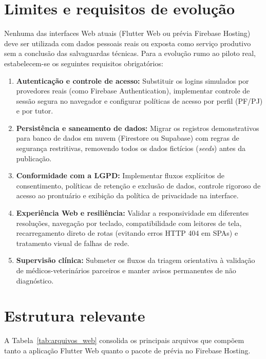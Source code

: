 \documentclass[12pt,a4paper]{article}
\begin{document}
\section{Limites e requisitos de evolução}
Nenhuma das interfaces Web atuais (Flutter Web ou prévia Firebase Hosting) deve ser utilizada com dados pessoais reais ou exposta como serviço produtivo sem a conclusão das salvaguardas técnicas. Para a evolução rumo ao piloto real, estabelecem-se os seguintes requisitos obrigatórios:

\begin{enumerate}[leftmargin=*]
  \item \textbf{Autenticação e controle de acesso:} Substituir os logins simulados por provedores reais (como Firebase Authentication), implementar controle de sessão segura no navegador e configurar políticas de acesso por perfil (PF/PJ) e por tutor.
  \item \textbf{Persistência e saneamento de dados:} Migrar os registros demonstrativos para banco de dados em nuvem (Firestore ou Supabase) com regras de segurança restritivas, removendo todos os dados fictícios (\textit{seeds}) antes da publicação.
  \item \textbf{Conformidade com a LGPD:} Implementar fluxos explícitos de consentimento, políticas de retenção e exclusão de dados, controle rigoroso de acesso ao prontuário e exibição da política de privacidade na interface.
  \item \textbf{Experiência Web e resiliência:} Validar a responsividade em diferentes resoluções, navegação por teclado, compatibilidade com leitores de tela, recarregamento direto de rotas (evitando erros HTTP 404 em SPAs) e tratamento visual de falhas de rede.
  \item \textbf{Supervisão clínica:} Submeter os fluxos da triagem orientativa à validação de médicos-veterinários parceiros e manter avisos permanentes de não diagnóstico.
\end{enumerate}

\section{Estrutura relevante}
A Tabela~\ref{tab:arquivos_web} consolida os principais arquivos que compõem tanto a aplicação Flutter Web quanto o pacote de prévia no Firebase Hosting.
\end{document}
